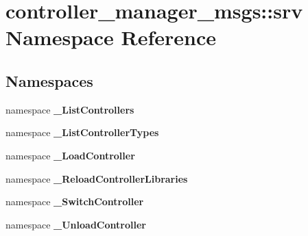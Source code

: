 \section{controller\-\_\-manager\-\_\-msgs\-:\-:srv \-Namespace \-Reference}
\label{namespacecontroller__manager__msgs_1_1srv}
\subsection*{\-Namespaces}
\begin{DoxyCompactItemize}
\item 
namespace {\bf \-\_\-\-List\-Controllers}
\item 
namespace {\bf \-\_\-\-List\-Controller\-Types}
\item 
namespace {\bf \-\_\-\-Load\-Controller}
\item 
namespace {\bf \-\_\-\-Reload\-Controller\-Libraries}
\item 
namespace {\bf \-\_\-\-Switch\-Controller}
\item 
namespace {\bf \-\_\-\-Unload\-Controller}
\end{DoxyCompactItemize}
